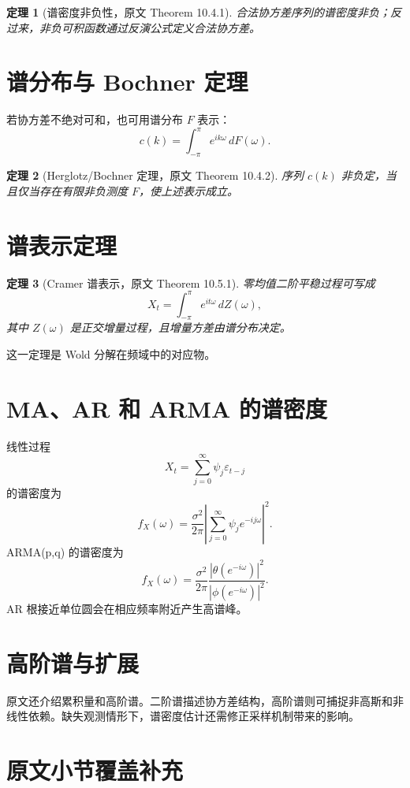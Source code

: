 \documentclass[11pt,a4paper,openany]{ctexbook}
\newtheorem{theorem}{定理}[section]
\begin{document}
\begin{theorem}[谱密度非负性，原文 Theorem 10.4.1]
合法协方差序列的谱密度非负；反过来，非负可积函数通过反演公式定义合法协方差。
\end{theorem}

\section{谱分布与 Bochner 定理}

若协方差不绝对可和，也可用谱分布 \(F\) 表示：
\[
  c(k)=\int_{-\pi}^{\pi}e^{ik\omega}\,dF(\omega).
\]
\begin{theorem}[Herglotz/Bochner 定理，原文 Theorem 10.4.2]
序列 \(c(k)\) 非负定，当且仅当存在有限非负测度 \(F\)，使上述表示成立。
\end{theorem}

\section{谱表示定理}

\begin{theorem}[Cramer 谱表示，原文 Theorem 10.5.1]
零均值二阶平稳过程可写成
\[
  X_t=\int_{-\pi}^{\pi}e^{it\omega}\,dZ(\omega),
\]
其中 \(Z(\omega)\) 是正交增量过程，且增量方差由谱分布决定。
\end{theorem}

这一定理是 Wold 分解在频域中的对应物。

\section{MA、AR 和 ARMA 的谱密度}

线性过程
\[
  X_t=\sum_{j=0}^{\infty}\psi_j\varepsilon_{t-j}
\]
的谱密度为
\[
  f_X(\omega)=\frac{\sigma^2}{2\pi}
  \left|\sum_{j=0}^{\infty}\psi_je^{-ij\omega}\right|^2.
\]
ARMA(p,q) 的谱密度为
\[
  f_X(\omega)=\frac{\sigma^2}{2\pi}
  \frac{|\theta(e^{-i\omega})|^2}{|\phi(e^{-i\omega})|^2}.
\]
AR 根接近单位圆会在相应频率附近产生高谱峰。

\section{高阶谱与扩展}

原文还介绍累积量和高阶谱。二阶谱描述协方差结构，高阶谱则可捕捉非高斯和非线性依赖。缺失观测情形下，谱密度估计还需修正采样机制带来的影响。

\section{原文小节覆盖补充}
\end{document}
